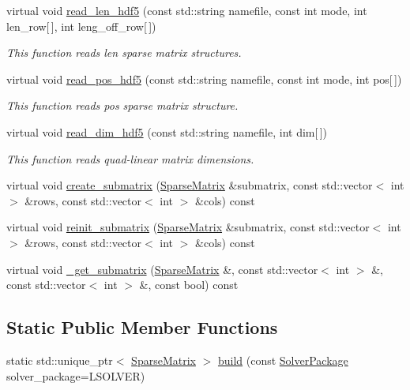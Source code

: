 \begin{DoxyCompactItemize}
virtual void \mbox{\hyperlink{classfemus_1_1_sparse_matrix_a0f747d58666367026b41df88d9cd8883}{read\+\_\+len\+\_\+hdf5}} (const std\+::string namefile, const int mode, int len\+\_\+row\mbox{[}$\,$\mbox{]}, int leng\+\_\+off\+\_\+row\mbox{[}$\,$\mbox{]})
\begin{DoxyCompactList}\small\item\em This function reads len sparse matrix structures. \end{DoxyCompactList}\item 
virtual void \mbox{\hyperlink{classfemus_1_1_sparse_matrix_a45d81485e45cf4de16aed8e9a9188efc}{read\+\_\+pos\+\_\+hdf5}} (const std\+::string namefile, const int mode, int pos\mbox{[}$\,$\mbox{]})
\begin{DoxyCompactList}\small\item\em This function reads pos sparse matrix structure. \end{DoxyCompactList}\item 
virtual void \mbox{\hyperlink{classfemus_1_1_sparse_matrix_a68acca57de5d1d8a45ae9417c5a240d9}{read\+\_\+dim\+\_\+hdf5}} (const std\+::string namefile, int dim\mbox{[}$\,$\mbox{]})
\begin{DoxyCompactList}\small\item\em This function reads quad-\/linear matrix dimensions. \end{DoxyCompactList}\item 
virtual void \mbox{\hyperlink{classfemus_1_1_sparse_matrix_ac801793000dd75765ad6ce63f08a00f9}{create\+\_\+submatrix}} (\mbox{\hyperlink{classfemus_1_1_sparse_matrix}{Sparse\+Matrix}} \&submatrix, const std\+::vector$<$ int $>$ \&rows, const std\+::vector$<$ int $>$ \&cols) const
\item 
virtual void \mbox{\hyperlink{classfemus_1_1_sparse_matrix_a02d6bc31a4e96062e7a4f35bbc32d74b}{reinit\+\_\+submatrix}} (\mbox{\hyperlink{classfemus_1_1_sparse_matrix}{Sparse\+Matrix}} \&submatrix, const std\+::vector$<$ int $>$ \&rows, const std\+::vector$<$ int $>$ \&cols) const
\item 
virtual void \mbox{\hyperlink{classfemus_1_1_sparse_matrix_a80eebabe8d7422e93241b884366341da}{\+\_\+get\+\_\+submatrix}} (\mbox{\hyperlink{classfemus_1_1_sparse_matrix}{Sparse\+Matrix}} \&, const std\+::vector$<$ int $>$ \&, const std\+::vector$<$ int $>$ \&, const bool) const
\end{DoxyCompactItemize}
\subsection*{Static Public Member Functions}
\begin{DoxyCompactItemize}
\item 
static std\+::unique\+\_\+ptr$<$ \mbox{\hyperlink{classfemus_1_1_sparse_matrix}{Sparse\+Matrix}} $>$ \mbox{\hyperlink{classfemus_1_1_sparse_matrix_a350a92495af225cec7b898b9fe29d9d2}{build}} (const \mbox{\hyperlink{_solver_package_enum_8hpp_a32541e934c944770722653e69abe38fe}{Solver\+Package}} solver\+\_\+package=L\+S\+O\+L\+V\+ER)
\end{DoxyCompactItemize}

